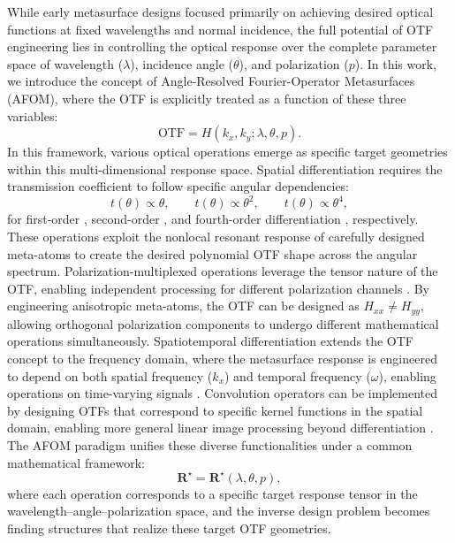 While early metasurface designs focused primarily on achieving desired optical functions at fixed wavelengths and normal incidence, the full potential of OTF engineering lies in controlling the optical response over the complete parameter space of wavelength ($\lambda$), incidence angle ($\theta$), and polarization ($p$). In this work, we introduce the concept of Angle-Resolved Fourier-Operator Metasurfaces (AFOM), where the OTF is explicitly treated as a function of these three variables:
\[
\mathrm{OTF} = H(k_x, k_y; \lambda, \theta, p).
\]
In this framework, various optical operations emerge as specific target geometries within this multi-dimensional response space. Spatial differentiation requires the transmission coefficient to follow specific angular dependencies:
\[
t(\theta) \propto \theta, \qquad
t(\theta) \propto \theta^2, \qquad
t(\theta) \propto \theta^4,
\]
for first-order \cite{silva2014}, second-order \cite{zhu2017,kwon2018}, and fourth-order differentiation \cite{qiu2025highorder}, respectively. These operations exploit the nonlocal resonant response of carefully designed meta-atoms to create the desired polynomial OTF shape across the angular spectrum. Polarization-multiplexed operations leverage the tensor nature of the OTF, enabling independent processing for different polarization channels \cite{deng2024,cotrufo2023natcom}. By engineering anisotropic meta-atoms, the OTF can be designed as $H_{xx} \neq H_{yy}$, allowing orthogonal polarization components to undergo different mathematical operations simultaneously. Spatiotemporal differentiation extends the OTF concept to the frequency domain, where the metasurface response is engineered to depend on both spatial frequency ($k_x$) and temporal frequency ($\omega$), enabling operations on time-varying signals \cite{tan2022,cordaro2019}. Convolution operators can be implemented by designing OTFs that correspond to specific kernel functions in the spatial domain, enabling more general linear image processing beyond differentiation \cite{zhou2023tailoring}. The AFOM paradigm unifies these diverse functionalities under a common mathematical framework:
\[
\mathbf{R}^\star = \mathbf{R}^\star(\lambda, \theta, p),
\]
where each operation corresponds to a specific target response tensor in the wavelength--angle--polarization space, and the inverse design problem becomes finding structures that realize these target OTF geometries.

